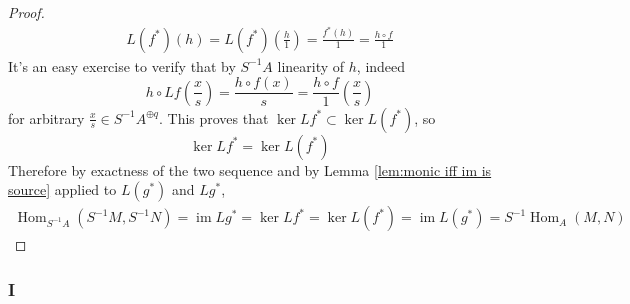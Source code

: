 \documentclass{article}
\DeclareMathOperator{\im}{im}
\DeclareMathOperator{\Hom}{Hom}
\begin{document}
\begin{proof}
\begin{align*}
        L(f^*)(h)=L(f^*)(\frac{h}{1})=\frac{f^*(h)}{1}=\frac{h\circ f}{1}
    \end{align*}
    It's an easy exercise to verify that by $S^{-1}A$ linearity of $h$, indeed 
    \[
    h\circ Lf(\frac{x}{s})=\frac{h\circ f(x)}{s}=\frac{h\circ f}{1}(\frac{x}{s})
    \]
    for arbitrary $\frac{x}{s}\in S^{-1}A^{\oplus q}$. This proves that $\ker Lf^*\subset \ker L(f^*)$, so
    \[
    \ker Lf^*=\ker L(f^*)
    \]
    Therefore by exactness of the two sequence and by Lemma \ref{lem:monic iff im is source} applied to $L(g^*)$ and $Lg^*$,
    \begin{align*}
        \Hom_{S^{-1}A}(S^{-1}M,S^{-1}N)=\im Lg^*=\ker Lf^*=\ker L(f^*)=\im L(g^*)=S^{-1}\Hom_A(M,N)
    \end{align*}
\end{proof}
\subsubsection{I}\label{1.6.I}
\end{document}
